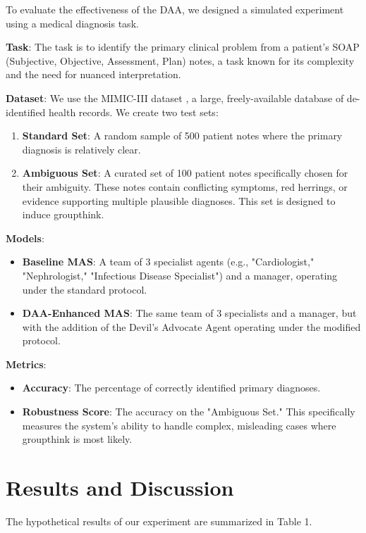 \documentclass{article}
\begin{document}
To evaluate the effectiveness of the DAA, we designed a simulated experiment using a medical diagnosis task.

\textbf{Task}: The task is to identify the primary clinical problem from a patient's SOAP (Subjective, Objective, Assessment, Plan) notes, a task known for its complexity and the need for nuanced interpretation.

\textbf{Dataset}: We use the MIMIC-III dataset \cite{johnson2016mimic}, a large, freely-available database of de-identified health records. We create two test sets:
\begin{enumerate}
    \item \textbf{Standard Set}: A random sample of 500 patient notes where the primary diagnosis is relatively clear.
    \item \textbf{Ambiguous Set}: A curated set of 100 patient notes specifically chosen for their ambiguity. These notes contain conflicting symptoms, red herrings, or evidence supporting multiple plausible diagnoses. This set is designed to induce groupthink.
\end{enumerate}

\textbf{Models}:
\begin{itemize}
    \item \textbf{Baseline MAS}: A team of 3 specialist agents (e.g., "Cardiologist," "Nephrologist," "Infectious Disease Specialist") and a manager, operating under the standard protocol.
    \item \textbf{DAA-Enhanced MAS}: The same team of 3 specialists and a manager, but with the addition of the Devil's Advocate Agent operating under the modified protocol.
\end{itemize}

\textbf{Metrics}:
\begin{itemize}
    \item \textbf{Accuracy}: The percentage of correctly identified primary diagnoses.
    \item \textbf{Robustness Score}: The accuracy on the "Ambiguous Set." This specifically measures the system's ability to handle complex, misleading cases where groupthink is most likely.
\end{itemize}

\section{Results and Discussion}

The hypothetical results of our experiment are summarized in Table 1.
\end{document}
